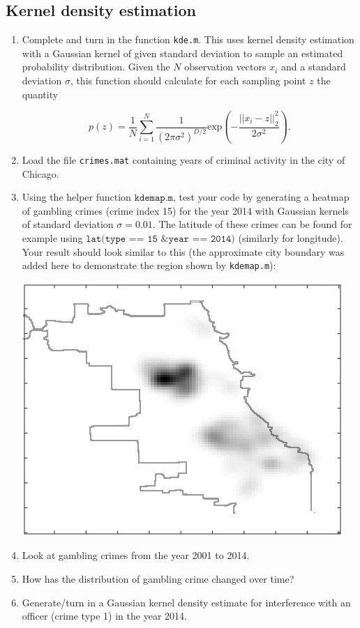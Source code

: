 \documentclass[11pt,noanswers,addpoints]{exam}
\begin{document}
\subsection{Kernel density estimation}
\begin{enumerate}
\item  Complete and turn in the function \texttt{kde.m}. This uses kernel density estimation with a Gaussian kernel of
given standard deviation to sample an estimated probability distribution. Given the $N$ observation vectors $x_i$ and a
standard deviation $\sigma$, this function should calculate for each sampling point $z$ the quantity

$$p(z) = \frac1N \sum_{i=1}^N \frac{1}{(2\pi\sigma^2)^{D/2}}\text{exp}\left(-\frac{||x_i - z||_2^2}{2\sigma^2}\right).$$

\item Load the file \texttt{crimes.mat} containing years of criminal activity in the city of Chicago.
\item Using the helper function $\texttt{kdemap.m}$, test your code by generating a heatmap of gambling crimes (crime index
15) for the year 2014 with Gaussian kernels of standard deviation $\sigma = 0.01$. The latitude of
 these crimes can be found for example using $\texttt{lat(type == 15 \& year == 2014)}$ (similarly for longitude). Your result should look similar to this
 (the approximate city boundary was added here to demonstrate the region shown by \texttt{kdemap.m}):
\begin{center}
\includegraphics[scale=0.5]{example.png}
 \end{center}
\item Look at gambling crimes from the year 2001 to 2014. 
\item  How has the distribution of gambling crime changed over time?
\item  Generate/turn in a Gaussian kernel density estimate for interference with an officer (crime type 1) in the year 2014.
\end{enumerate}
\end{document}
